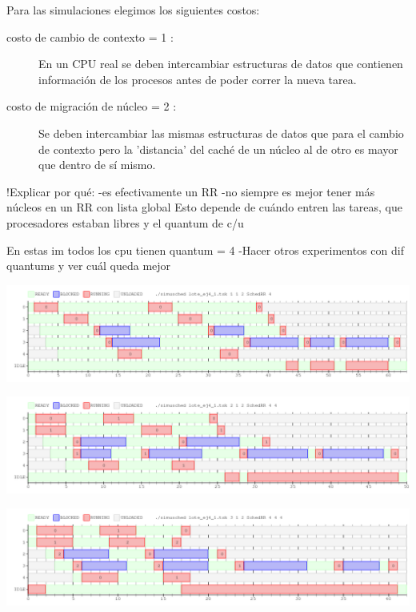 Para las simulaciones elegimos los siguientes costos:
\begin{description}
 \item[costo de cambio de contexto = 1 :]{En un CPU real se deben intercambiar estructuras de datos que contienen información de los procesos antes de poder correr la nueva tarea.}
 \item[costo de migración de núcleo = 2 :]{Se deben intercambiar las mismas estructuras de datos que para el cambio de contexto pero la 'distancia' del caché de un núcleo al de otro es mayor que dentro de sí mismo.}
\end{description}

!Explicar por qué: 
-es efectivamente un RR
-no siempre es mejor tener más núcleos en un RR con lista global
Esto depende de cuándo entren las tareas, que procesadores
estaban libres y el quantum de c/u

En estas im todos los cpu tienen quantum = 4
-Hacer otros experimentos con dif quantums y ver cuál queda mejor

\begin{center}
 \includegraphics[scale=0.5]{./RR/RR_1cpu.png}
\end{center}

\begin{center}
 \includegraphics[scale=0.5]{./RR/RR_2cpu.png}
\end{center}

\begin{center}
 \includegraphics[scale=0.5]{./RR/RR_3cpu.png}
\end{center}

